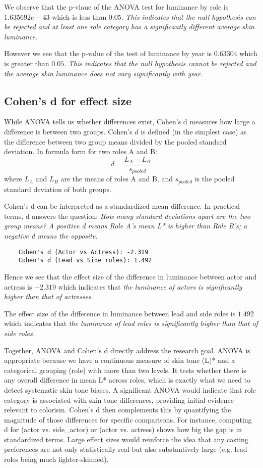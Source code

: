 We observe that the p-vlaue of the ANOVA test for luminance by role is $1.635692e-43$ which is less than $0.05$. \textit{This indicates that the null hypothesis can be rejected and at least one role category has a significantly different average skin luminance.}

However we see that the p-value of the test of luminance by year is $0.63304$ which is greater than $0.05$. \textit{This indicates that the null hypothesis cannot be rejected and the average skin luminance does not vary significantly with year.}

\subsection{Cohen's d for effect size}
While ANOVA tells us whether differences exist, Cohen's d measures how large a difference is between two groups. Cohen's $d$ is defined (in the simplest case) as the difference between two group means divided by the pooled standard deviation. In formula form for two roles A and B:
$$d = \frac{L_A - L_B}{s_{\textit{pooled}}}$$
where $L_A$ and $L_B$ are the means of roles A and B, and $s_{\textit{pooled}}$ is the pooled standard deviation of both groups. 

Cohen's d can be interpreted as a standardized mean difference. In practical terms, d answers the question: \textit{How many standard deviations apart are the two group means? A positive d means Role A's mean L* is higher than Role B's; a negative d means the opposite.}

\begin{lstlisting}
    Cohen's d (Actor vs Actress): -2.319
    Cohen's d (Lead vs Side roles): 1.492
\end{lstlisting}

Hence we see that the effect size of the difference in luminance between actor and actress is $-2.319$ which indicates that \textit{the luminance of actors is significantly higher than that of actresses}. 

The effect size of the difference in luminance between lead and side roles is $1.492$ which indicates that \textit{the luminance of lead roles is significantly higher than that of side roles.}

Together, ANOVA and Cohen's d directly address the research goal. ANOVA is appropriate because we have a continuous measure of skin tone (L)* and a categorical grouping (role) with more than two levels. It tests whether there is any overall difference in mean L* across roles, which is exactly what we need to detect systematic skin tone biases. A significant ANOVA would indicate that role category is associated with skin tone differences, providing initial evidence relevant to colorism. Cohen's d then complements this by quantifying the magnitude of those differences for specific comparisons. For instance, computing d for (actor vs. side\_actor) or (actor vs. actress) shows how big the gap is in standardized terms. Large effect sizes would reinforce the idea that any casting preferences are not only statistically real but also substantively large (e.g. lead roles being much lighter-skinned).
